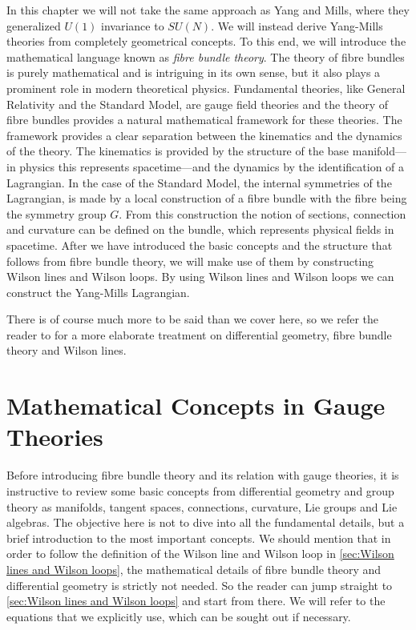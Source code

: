 \medskip
In this chapter we will not take the same approach as Yang and Mills, where they generalized $U(1)$ invariance to $SU(N)$. We will instead derive Yang-Mills theories from completely geometrical concepts. To this end, we will introduce the mathematical language known as \emph{fibre bundle theory}. The theory of fibre bundles is purely mathematical and is intriguing in its own sense, but it also plays a prominent role in modern theoretical physics. Fundamental theories, like General Relativity and the Standard Model, are gauge field theories and the theory of fibre bundles provides a natural mathematical framework for these theories. The framework provides a clear separation between the kinematics and the dynamics of the theory. The kinematics is provided by the structure of the base manifold---in physics this represents spacetime---and the dynamics by the identification of a Lagrangian. In the case of the Standard Model, the internal symmetries of the Lagrangian, is made by a local construction of a fibre bundle with the fibre being the symmetry group $G$. From this construction the notion of sections, connection and curvature can be defined on the bundle, which represents physical fields in spacetime. After we have introduced the basic concepts and the structure that follows from fibre bundle theory, we will make use of them by constructing Wilson lines and Wilson loops. By using Wilson lines and Wilson loops we can construct the Yang-Mills Lagrangian.

There is of course much more to be said than we cover here, so we refer the reader to \cite{Carroll:2004st,Zee:2016fuk,Hamilton:2017gbn,Nakahara:2003nw} for a more elaborate treatment on differential geometry, fibre bundle theory and Wilson lines.

\section{Mathematical Concepts in Gauge Theories}
Before introducing fibre bundle theory and its relation with gauge theories, it is instructive to review some basic concepts from differential geometry and group theory as manifolds, tangent spaces, connections, curvature, Lie groups and Lie algebras. The objective here is not to dive into all the fundamental details, but a brief introduction to the most important concepts. We should mention that in order to follow the definition of the Wilson line and Wilson loop in \cref{sec:Wilson lines and Wilson loops}, the mathematical details of fibre bundle theory and differential geometry is strictly not needed. So the reader can jump straight to \cref{sec:Wilson lines and Wilson loops} and start from there. We will refer to the equations that we explicitly use, which can be sought out if necessary. 


